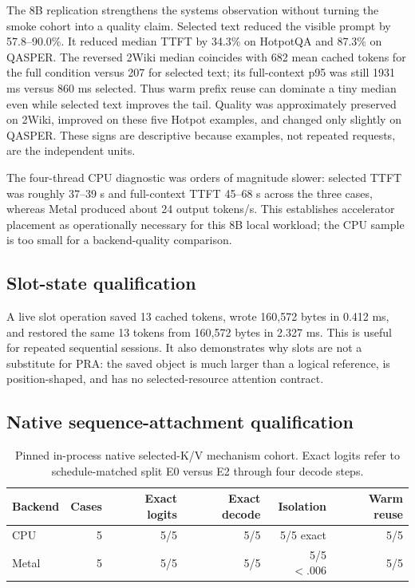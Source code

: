 \documentclass[10pt]{article}
\begin{document}
The 8B replication strengthens the systems observation without turning the
smoke cohort into a quality claim. Selected text reduced the visible prompt by
57.8--90.0\%. It reduced median TTFT by 34.3\% on HotpotQA and 87.3\% on
QASPER. The reversed 2Wiki median coincides with 682 mean cached tokens for the
full condition versus 207 for selected text; its full-context p95 was still
1931 ms versus 860 ms selected. Thus warm prefix reuse can dominate a tiny
median even while selected text improves the tail. Quality was approximately
preserved on 2Wiki, improved on these five Hotpot examples, and changed only
slightly on QASPER. These signs are descriptive because examples, not repeated
requests, are the independent units.

The four-thread CPU diagnostic was orders of magnitude slower: selected TTFT
was roughly 37--39 s and full-context TTFT 45--68 s across the three cases,
whereas Metal produced about 24 output tokens/s. This establishes accelerator
placement as operationally necessary for this 8B local workload; the CPU sample
is too small for a backend-quality comparison.

\subsection{Slot-state qualification}
A live slot operation saved 13 cached tokens, wrote 160,572 bytes in 0.412 ms,
and restored the same 13 tokens from 160,572 bytes in 2.327 ms. This is useful
for repeated sequential sessions. It also demonstrates why slots are not a
substitute for PRA: the saved object is much larger than a logical reference,
is position-shaped, and has no selected-resource attention contract.

\subsection{Native sequence-attachment qualification}

\begin{table}[h]
\centering\small
\caption{Pinned in-process native selected-K/V mechanism cohort. Exact logits
refer to schedule-matched split E0 versus E2 through four decode steps.}
\begin{tabular}{lrrrrr}
\toprule Backend & Cases & Exact logits & Exact decode & Isolation & Warm reuse\\
\midrule
CPU & 5 & 5/5 & 5/5 & 5/5 exact & 5/5\\
Metal & 5 & 5/5 & 5/5 & 5/5 $<.006$ & 5/5\\
\bottomrule
\end{tabular}
\label{tab:native-sequence-attach}
\end{table}
\end{document}
